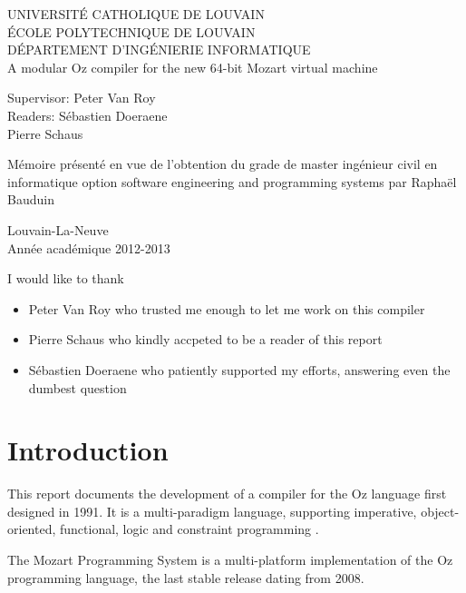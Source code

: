 \documentclass[a4paper]{memoir}
\newcommand*{\titleMS}{\begingroup%
{

\pagestyle{empty}
\centering 
{\LARGE UNIVERSITÉ CATHOLIQUE DE LOUVAIN}\\
{\LARGE ÉCOLE POLYTECHNIQUE DE LOUVAIN}\\
{\LARGE DÉPARTEMENT D'INGÉNIERIE INFORMATIQUE}\\[2\baselineskip]
\vspace{0.2\textheight}
{\LARGE A modular Oz compiler for the new 64-bit Mozart virtual machine}\par
\vspace{0.2\textheight}
\begin{minipage}[t]{0.45\textwidth}
  Supervisor: Peter Van Roy\\
  Readers: \hspace{3.9mm}S\'{e}bastien Doeraene\\
  \hspace*{18.5mm}Pierre Schaus
\end{minipage}
\hspace{3mm}
\begin{minipage}[t]{0.55\textwidth}
  M\'{e}moire pr\'{e}sent\'{e} en vue de l'obtention du grade de master ing\'{e}nieur civil en informatique option software engineering and programming systems par Raphaël Bauduin
\end{minipage}
\vspace*{2cm}
\begin{minipage}[t]{\textwidth}
\vspace*{4cm}
\centering 

Louvain-La-Neuve\\
Ann\'{e}e acad\'{e}mique 2012-2013
\end{minipage}
} %
\endgroup}
\begin{document}
\newcommand{\nav}[1]{}
\renewcommand{\topfraction}{.85}
\renewcommand{\bottomfraction}{.7}
\renewcommand{\textfraction}{.15}
\renewcommand{\floatpagefraction}{.66}
\renewcommand{\dbltopfraction}{.66}
\renewcommand{\dblfloatpagefraction}{.66}
\setcounter{topnumber}{9}
\setcounter{bottomnumber}{9}
\setcounter{totalnumber}{20}
\setcounter{dbltopnumber}{9}

\lstset{language=Oz,basicstyle=\ttfamily\small,columns=fullflexible,keepspaces=true,
escapechar=µ}

\ifdraftdoc
{}
\fi

%
\frontmatter

\begin{titlingpage}
\titleMS
\end{titlingpage}

I would like to thank
\begin{itemize}
  \item Peter Van Roy who trusted me enough to let me work on this compiler
  \item Pierre Schaus who kindly accpeted to be a reader of this report
  \item S\'{e}bastien Doeraene who patiently supported my efforts, answering even the dumbest question 
\end{itemize}
\cleardoublepage

\tableofcontents

\mainmatter
\chapter{Introduction}

This report documents the development of a compiler for the Oz language first designed in 1991. It is a multi-paradigm language, supporting imperative, object-oriented, functional, logic and constraint programming \cite{OzOv}.

The Mozart Programming System is a multi-platform implementation of the Oz programming language\cite{Moz}, the last stable release dating from 2008.
\end{document}
